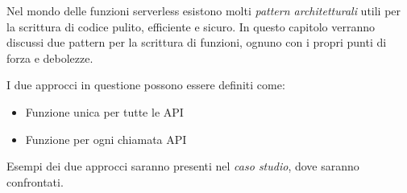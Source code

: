 Nel mondo delle funzioni serverless esistono molti \textit{pattern architetturali} utili per la scrittura di codice pulito, efficiente e sicuro. In questo capitolo verranno discussi due pattern per la scrittura di funzioni, ognuno con i propri punti di forza e debolezze.

I due approcci in questione possono essere definiti come:
\begin{itemize}
    \item Funzione unica per tutte le API
    \item Funzione per ogni chiamata API
\end{itemize}

Esempi dei due approcci saranno presenti nel \textit{caso studio}, dove saranno confrontati.